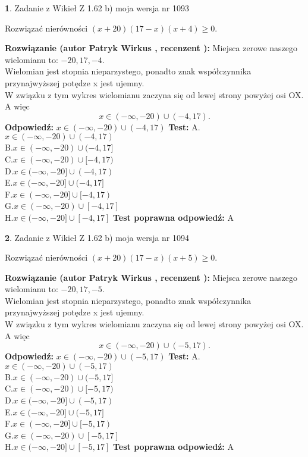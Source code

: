 \documentclass[12pt, a4paper]{article}
\theoremstyle{definition} %
\newtheorem{zad}{}
\newcommand{\zadStart}[1]{\begin{zad}#1\newline}
\newcommand{\zadStop}{\end{zad}}
\newcommand{\rozwStart}[2]{\noindent \textbf{Rozwiązanie (autor #1 , recenzent #2): }\newline}
\newcommand{\rozwStop}{\newline}
\newcommand{\odpStart}{\noindent \textbf{Odpowiedź:}\newline}
\newcommand{\odpStop}{\newline}
\newcommand{\testStart}{\noindent \textbf{Test:}\newline}
\newcommand{\testStop}{\newline}
\newcommand{\kluczStart}{\noindent \textbf{Test poprawna odpowiedź:}\newline}
\newcommand{\kluczStop}{\newline}
\begin{document}
\zadStart{Zadanie z Wikieł Z 1.62 b) moja wersja nr 1093}

Rozwiązać nierówności $(x+20)(17-x)(x+4)\ge0$.
\zadStop
\rozwStart{Patryk Wirkus}{}
Miejsca zerowe naszego wielomianu to: $-20, 17, -4$.\\
Wielomian jest stopnia nieparzystego, ponadto znak współczynnika przy\linebreak najwyższej potędze x jest ujemny.\\ W związku z tym wykres wielomianu zaczyna się od lewej strony powyżej osi OX. A więc $$x \in (-\infty,-20) \cup (-4,17).$$
\rozwStop
\odpStart
$x \in (-\infty,-20) \cup (-4,17)$
\odpStop
\testStart
A.$x \in (-\infty,-20) \cup (-4,17)$\\
B.$x \in (-\infty,-20) \cup (-4,17]$\\
C.$x \in (-\infty,-20) \cup [-4,17)$\\
D.$x \in (-\infty,-20] \cup (-4,17)$\\
E.$x \in (-\infty,-20] \cup (-4,17]$\\
F.$x \in (-\infty,-20] \cup [-4,17)$\\
G.$x \in (-\infty,-20) \cup [-4,17]$\\
H.$x \in (-\infty,-20] \cup [-4,17]$
\testStop
\kluczStart
A
\kluczStop



\zadStart{Zadanie z Wikieł Z 1.62 b) moja wersja nr 1094}

Rozwiązać nierówności $(x+20)(17-x)(x+5)\ge0$.
\zadStop
\rozwStart{Patryk Wirkus}{}
Miejsca zerowe naszego wielomianu to: $-20, 17, -5$.\\
Wielomian jest stopnia nieparzystego, ponadto znak współczynnika przy\linebreak najwyższej potędze x jest ujemny.\\ W związku z tym wykres wielomianu zaczyna się od lewej strony powyżej osi OX. A więc $$x \in (-\infty,-20) \cup (-5,17).$$
\rozwStop
\odpStart
$x \in (-\infty,-20) \cup (-5,17)$
\odpStop
\testStart
A.$x \in (-\infty,-20) \cup (-5,17)$\\
B.$x \in (-\infty,-20) \cup (-5,17]$\\
C.$x \in (-\infty,-20) \cup [-5,17)$\\
D.$x \in (-\infty,-20] \cup (-5,17)$\\
E.$x \in (-\infty,-20] \cup (-5,17]$\\
F.$x \in (-\infty,-20] \cup [-5,17)$\\
G.$x \in (-\infty,-20) \cup [-5,17]$\\
H.$x \in (-\infty,-20] \cup [-5,17]$
\testStop
\kluczStart
A
\kluczStop
\end{document}
